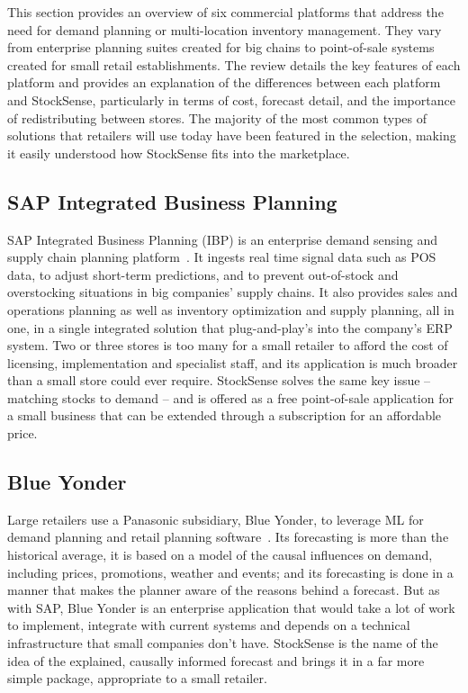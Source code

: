 \documentclass{StockSense}
\begin{document}
This section provides an overview of six commercial platforms that address the need for demand planning or multi-location inventory management. They vary from enterprise planning suites created for big chains to point-of-sale systems created for small retail establishments. The review details the key features of each platform and provides an explanation of the differences between each platform and StockSense, particularly in terms of cost, forecast detail, and the importance of redistributing between stores. The majority of the most common types of solutions that retailers will use today have been featured in the selection, making it easily understood how StockSense fits into the marketplace.

\subsection{SAP Integrated Business Planning}

SAP Integrated Business Planning (IBP) is an enterprise demand sensing and supply chain planning platform~\cite{sapibp}. It ingests real time signal data such as POS data, to adjust short-term predictions, and to prevent out-of-stock and overstocking situations in big companies' supply chains. It also provides sales and operations planning as well as inventory optimization and supply planning, all in one, in a single integrated solution that plug-and-play's into the company's ERP system. Two or three stores is too many for a small retailer to afford the cost of licensing, implementation and specialist staff, and its application is much broader than a small store could ever require. StockSense solves the same key issue – matching stocks to demand – and is offered as a free point-of-sale application for a small business that can be extended through a subscription for an affordable price.

\subsection{Blue Yonder}

Large retailers use a Panasonic subsidiary, Blue Yonder, to leverage ML for demand planning and retail planning software~\cite{blueyonder}. Its forecasting is more than the historical average, it is based on a model of the causal influences on demand, including prices, promotions, weather and events; and its forecasting is done in a manner that makes the planner aware of the reasons behind a forecast. But as with SAP, Blue Yonder is an enterprise application that would take a lot of work to implement, integrate with current systems and depends on a technical infrastructure that small companies don't have. StockSense is the name of the idea of the explained, causally informed forecast and brings it in a far more simple package, appropriate to a small retailer.
\end{document}
